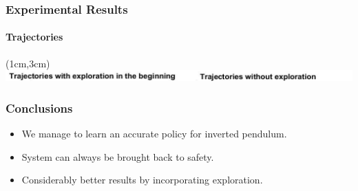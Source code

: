 \documentclass[t]{beamer}
\begin{document}
\begin{frame}
\frametitle{Experimental Results}
\framesubtitle{Trajectories}
\begin{textblock*}{12cm}(1cm,3cm) %
{\includegraphics[width=\textwidth]{switch_title}}
\end{textblock*}
\end{frame}



\begin{frame}
\frametitle{Conclusions}
\begin{itemize}
\item We manage to learn an accurate policy for inverted pendulum.
\item System can always be brought back to safety.
\item Considerably better results by incorporating exploration.
\end{itemize}

\end{frame}
\end{document}
